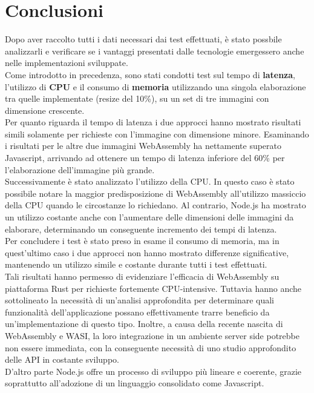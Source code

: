 \chapter*{Conclusioni}
\label{Conclusioni}
Dopo aver raccolto tutti i dati necessari dai test effettuati, è stato possbile analizzarli e verificare se i vantaggi presentati dalle tecnologie emergessero anche nelle implementazioni sviluppate.
\\Come introdotto in precedenza, sono stati condotti test sul tempo di \textbf{latenza}, l'utilizzo di \textbf{CPU} e il consumo di \textbf{memoria} utilizzando una singola elaborazione tra quelle implementate (resize del 10\%), su un set di tre immagini con dimensione crescente.
\\Per quanto riguarda il tempo di latenza i due approcci hanno mostrato risultati simili solamente per richieste con l'immagine con dimensione minore. Esaminando i risultati per le altre due immagini WebAssembly ha nettamente superato Javascript, arrivando ad ottenere un tempo di latenza inferiore del 60\% per l'elaborazione dell'immagine più grande.
\\Successivamente è stato analizzato l'utilizzo della CPU. In questo caso è stato possibile notare la maggior predisposizione di WebAssembly all'utilizzo massiccio della CPU quando le circostanze lo richiedano.
Al contrario, Node.js ha mostrato un utilizzo costante anche con l'aumentare delle dimensioni delle immagini da elaborare, determinando un conseguente incremento dei tempi di latenza.
\\Per concludere i test è stato preso in esame il consumo di memoria, ma in quest'ultimo caso i due approcci non hanno mostrato differenze significative, mantenendo un utilizzo simile e costante durante tutti i test effettuati.
\\Tali risultati hanno permesso di evidenziare l'efficacia di WebAssembly su piattaforma Rust per richieste fortemente CPU-intensive.
Tuttavia hanno anche sottolineato la necessità di un'analisi approfondita per determinare quali funzionalità dell’applicazione possano effettivamente trarre beneficio da un’implementazione di questo tipo.
Inoltre, a causa della recente nascita di WebAssembly e WASI, la loro integrazione in un ambiente server side potrebbe non essere immediata, con la conseguente necessità di uno studio approfondito delle API in costante sviluppo.
\\D'altro parte Node.js offre un processo di sviluppo più lineare e coerente, grazie soprattutto all'adozione di un linguaggio consolidato come Javascript.
